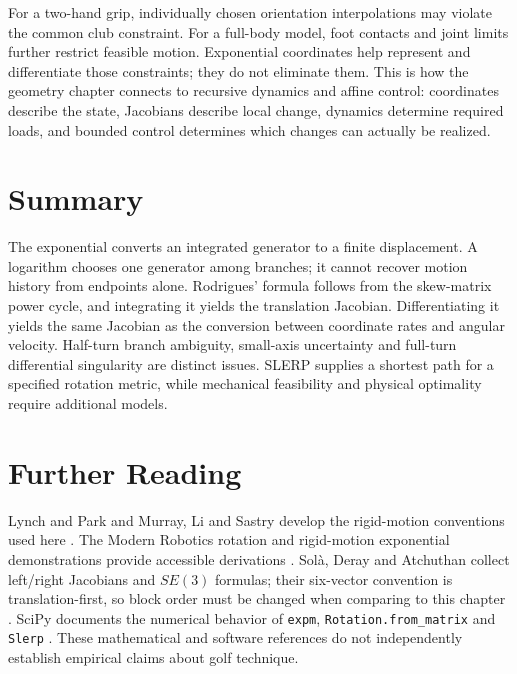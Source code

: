 For a two-hand grip, individually chosen orientation interpolations may violate the common club constraint. For a full-body model, foot contacts and joint limits further restrict feasible motion. Exponential coordinates help represent and differentiate those constraints; they do not eliminate them. This is how the geometry chapter connects to recursive dynamics and affine control: coordinates describe the state, Jacobians describe local change, dynamics determine required loads, and bounded control determines which changes can actually be realized.

\section{Summary}
\label{sec:exp_summary}

The exponential converts an integrated generator to a finite displacement. A logarithm chooses one generator among branches; it cannot recover motion history from endpoints alone. Rodrigues' formula follows from the skew-matrix power cycle, and integrating it yields the translation Jacobian. Differentiating it yields the same Jacobian as the conversion between coordinate rates and angular velocity. Half-turn branch ambiguity, small-axis uncertainty and full-turn differential singularity are distinct issues. SLERP supplies a shortest path for a specified rotation metric, while mechanical feasibility and physical optimality require additional models.

\section{Further Reading}
\label{sec:further_reading_ch6}

Lynch and Park and Murray, Li and Sastry develop the rigid-motion conventions used here \cite{Lynch2017,Murray1994}. The Modern Robotics rotation and rigid-motion exponential demonstrations provide accessible derivations \cite{ModernRoboticsRotationExpReview,ModernRoboticsRigidExpReview}. Sol\`a, Deray and Atchuthan collect left/right Jacobians and $SE(3)$ formulas; their six-vector convention is translation-first, so block order must be changed when comparing to this chapter \cite{SolaMicroLieReview}. SciPy documents the numerical behavior of \texttt{expm}, \texttt{Rotation.from\_matrix} and \texttt{Slerp} \cite{SciPyExpmReview,SciPyRotationMatrixReview,SciPySlerpReview}. These mathematical and software references do not independently establish empirical claims about golf technique.

